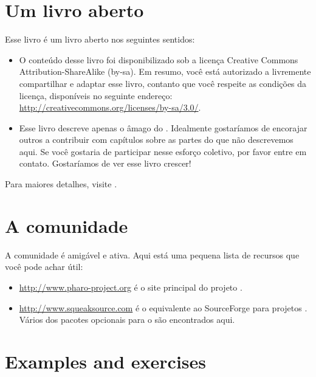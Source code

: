 \documentclass[a4paper,10pt,twoside]{book}
\begin{document}
\section*{Um livro aberto}

Esse livro é um livro aberto nos seguintes sentidos:

\begin{itemize}

\item	O conteúdo desse livro foi disponibilizado sob a licença Creative Commons Attribution-ShareAlike (by-sa).
		Em resumo, você está autorizado a livremente compartilhar e adaptar esse livro, contanto que você respeite as condições da licença, disponíveis no seguinte endereço:
		\url{http://creativecommons.org/licenses/by-sa/3.0/}.

\item	Esse livro descreve apenas o âmago do \pharo.
		Idealmente gostaríamos de encorajar outros a contribuir com capítulos
		sobre as partes do \pharo que não descrevemos aqui.
		Se você gostaria de participar nesse esforço coletivo, por favor
		entre em contato.  Gostaríamos de ver esse livro crescer!
\end{itemize}

Para maiores detalhes, visite \pbe.

\section*{A comunidade \pharo}

A comunidade \pharo é amigável e ativa.
Aqui está uma pequena lista de recursos que você pode achar útil:

\begin{itemize}
\item \url{http://www.pharo-project.org} é o site principal do projeto \pharo.

\item \url{http://www.squeaksource.com} é o equivalente ao SourceForge para projetos \pharo.
Vários dos pacotes opcionais para o \pharo são encontrados aqui.
\end{itemize}

\section*{Examples and exercises}
\end{document}
